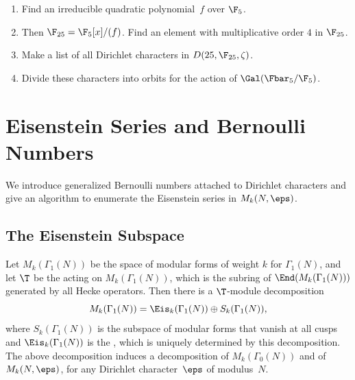 \begin{exercises}
\item\label{ex:charmod5}
\begin{enumerate}
\item Find an irreducible quadratic polynomial~$f$ over $\F_5$.
\item Then $\F_{25} = \F_5[x]/(f)$.  Find an element with multiplicative
order $4$ in $\F_{25}$.
\item Make a list of all Dirichlet characters in $D(25,\F_{25},\zeta)$.
\item Divide these characters into orbits for the action
of $\Gal(\Fbar_5/\F_5)$.
\end{enumerate}


\end{exercises}






















\chapter{Eisenstein Series and Bernoulli Numbers}\label{ch:eisen}
We introduce generalized Bernoulli numbers attached to Dirichlet
characters and give an algorithm to enumerate the Eisenstein series
in $M_k(N,\eps)$.

\section{The Eisenstein Subspace}

Let $M_k(\Gamma_1(N))$ be the space of modular forms of weight
$k$ for $\Gamma_1(N)$, and let $\T$ be the 
acting on $M_k(\Gamma_1(N))$, which is the subring of 
$\End(M_k(\Gamma_1(N)))$ generated by all Hecke operators.   
Then there is a $\T$-module decomposition
$$
  M_k(\Gamma_1(N)) = \Eis_k(\Gamma_1(N)) \oplus S_k(\Gamma_1(N)),
$$
where $S_k(\Gamma_1(N))$ is the subspace of modular forms that vanish
at all cusps and $\Eis_k(\Gamma_1(N))$ is the , which is uniquely determined by this decomposition.  
The above decomposition
induces a decomposition of $M_k(\Gamma_0(N))$ and of
$M_k(N,\eps)$, for any Dirichlet character~$\eps$ of modulus~$N$.


